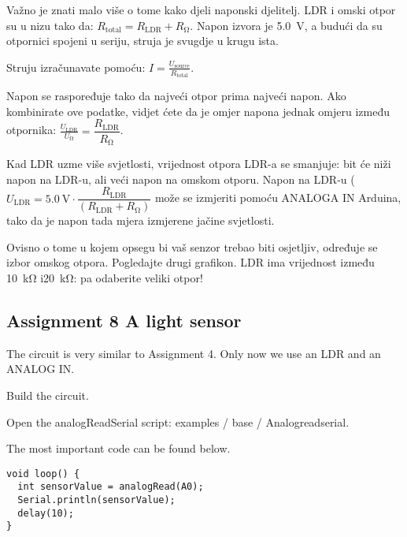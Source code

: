 \documentclass{arduino}
\begin{document}
Važno je znati malo više o tome kako djeli naponski djelitelj. LDR i omski otpor su u nizu tako da: $ R_\mathrm{total} = R_\mathrm{LDR} + R_{\si{\ohm}} $. Napon izvora je \SI{5,0}{\volt}, a budući da su otpornici spojeni u seriju, struja je svugdje u krugu ista.

Struju izračunavate pomoću: $ I = \frac{U_\mathrm{source}}{R_\mathrm{total}} $. 

Napon se raspoređuje tako da najveći otpor prima najveći napon. Ako kombinirate ove podatke, vidjet ćete da je omjer napona jednak omjeru između otpornika: $ \frac{U_\mathrm{LDR}}{U _ {\si{\ohm}}} = \dfrac{R_\mathrm{LDR}}{R_{\si{\ohm}}} $.


Kad LDR uzme više svjetlosti, vrijednost otpora LDR-a se smanjuje: bit će niži napon na LDR-u, ali veći napon na omskom otporu. Napon na LDR-u ($ U_\mathrm{LDR} = \SI{5.0}{\volt} \cdot \dfrac{R_\mathrm{LDR}}{(R_\mathrm{LDR} + R_{\si{\ohm}})} $ može se izmjeriti pomoću ANALOGA IN Arduina, tako da je napon tada mjera izmjerene jačine svjetlosti.

Ovisno o tome u kojem opsegu bi vaš senzor trebao biti osjetljiv, određuje se izbor omskog otpora. Pogledajte drugi grafikon. LDR ima vrijednost između \SI{10}{\kilo\ohm} i\SI{20}{\kilo\ohm}: pa odaberite veliki otpor!

\newpage

\subsection{Assignment 8 A light sensor}


The circuit is very similar to Assignment 4. Only now we use an LDR and an ANALOG IN.

\begin{alphalist}
\item Build the circuit.

\item Open the analogReadSerial  script: examples / base / Analogreadserial.
\end{alphalist}

The most important code can be found below.

\begin{lstlisting}
void loop() {
  int sensorValue = analogRead(A0);
  Serial.println(sensorValue);
  delay(10);
}
\end{lstlisting}
\end{document}
